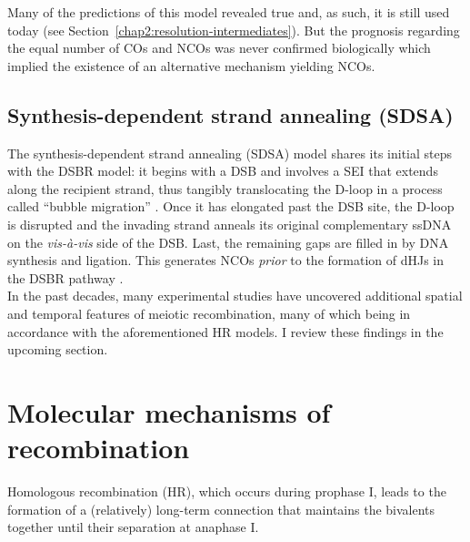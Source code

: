 Many of the predictions of this model revealed true and, as such, it is still used today (see Section~\ref{chap2:resolution-intermediates}).
But the prognosis regarding the equal number of COs and NCOs was never confirmed biologically \citep{bishop2004early} which implied the existence of an alternative mechanism yielding NCOs.





\subsection{Synthesis-dependent strand annealing (SDSA)}
\label{chap2:model-SDSA}

The synthesis-dependent strand annealing (SDSA) model \citep{resnick1976repair,nassif1994efficient,ferguson1996recombinational} shares its initial steps with the DSBR model: it begins with a DSB and involves a SEI that extends along the recipient strand, thus tangibly translocating the D-loop in a process called “bubble migration” \citep[reviewed in][]{mcmahill2007synthesisdependent}.
Once it has elongated past the DSB site, the D-loop is disrupted and the invading strand anneals its original complementary ssDNA on the \textit{vis-\`a-vis} side of the DSB\@.
Last, the remaining gaps are filled in by DNA synthesis and ligation.
This generates NCOs \textit{prior} to the formation of dHJs in the DSBR pathway \citep{allers2001differential}.\\



In the past decades, many experimental studies have uncovered additional spatial and temporal features of meiotic recombination, many of which being in accordance with the aforementioned HR models. 
I review these findings in the upcoming section.













\section{Molecular mechanisms of recombination}

Homologous recombination (HR), which occurs during prophase I, leads to the formation of a (relatively) long-term connection that maintains the bivalents together until their separation at anaphase I\@.

